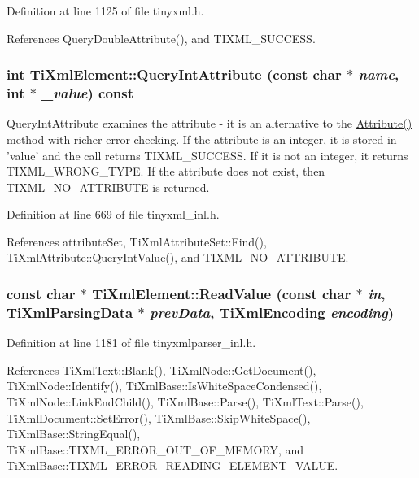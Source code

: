 Definition at line 1125 of file tinyxml.h.

References QueryDoubleAttribute(), and TIXML\_\-SUCCESS.\hypertarget{class_ti_xml_element_aea0bfe471380f281c5945770ddbf52b9}{
\subsubsection[{QueryIntAttribute}]{\setlength{\rightskip}{0pt plus 5cm}int TiXmlElement::QueryIntAttribute (const char $\ast$ {\em name}, \/  int $\ast$ {\em \_\-value}) const}}
\label{class_ti_xml_element_aea0bfe471380f281c5945770ddbf52b9}
QueryIntAttribute examines the attribute -\/ it is an alternative to the \hyperlink{class_ti_xml_element_ac1e4691e9375ba4e665dce7e46a50a9c}{Attribute()} method with richer error checking. If the attribute is an integer, it is stored in 'value' and the call returns TIXML\_\-SUCCESS. If it is not an integer, it returns TIXML\_\-WRONG\_\-TYPE. If the attribute does not exist, then TIXML\_\-NO\_\-ATTRIBUTE is returned. 

Definition at line 669 of file tinyxml\_\-inl.h.

References attributeSet, TiXmlAttributeSet::Find(), TiXmlAttribute::QueryIntValue(), and TIXML\_\-NO\_\-ATTRIBUTE.\hypertarget{class_ti_xml_element_ac786bce103042d3837c4cc2ff6967d41}{
\subsubsection[{ReadValue}]{\setlength{\rightskip}{0pt plus 5cm}const char $\ast$ TiXmlElement::ReadValue (const char $\ast$ {\em in}, \/  {\bf TiXmlParsingData} $\ast$ {\em prevData}, \/  {\bf TiXmlEncoding} {\em encoding})}}
\label{class_ti_xml_element_ac786bce103042d3837c4cc2ff6967d41}


Definition at line 1181 of file tinyxmlparser\_\-inl.h.

References TiXmlText::Blank(), TiXmlNode::GetDocument(), TiXmlNode::Identify(), TiXmlBase::IsWhiteSpaceCondensed(), TiXmlNode::LinkEndChild(), TiXmlBase::Parse(), TiXmlText::Parse(), TiXmlDocument::SetError(), TiXmlBase::SkipWhiteSpace(), TiXmlBase::StringEqual(), TiXmlBase::TIXML\_\-ERROR\_\-OUT\_\-OF\_\-MEMORY, and TiXmlBase::TIXML\_\-ERROR\_\-READING\_\-ELEMENT\_\-VALUE.

